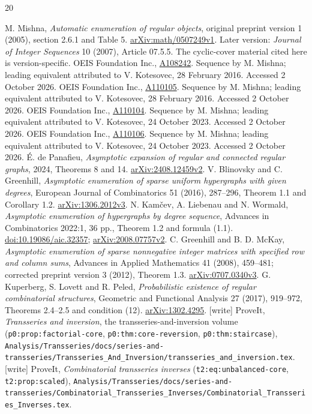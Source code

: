 \documentclass[11pt]{article}
\theoremstyle{definition}\newtheorem{definition}[theorem]{Definition}
\theoremstyle{remark}\newtheorem{remark}[theorem]{Remark}
\numberwithin{equation}{section}
\begin{document}
\begin{thebibliography}{20}
\small\raggedright
\setlength{\itemsep}{3pt}
 M. Mishna, \emph{Automatic enumeration of regular objects}, original preprint version 1 (2005), section 2.6.1 and Table 5. \href{https://arxiv.org/abs/math/0507249v1}{arXiv:math/0507249v1}. Later version: \emph{Journal of Integer Sequences} 10 (2007), Article 07.5.5. The cyclic-cover material cited here is version-specific.
 OEIS Foundation Inc., \href{https://oeis.org/A108242}{A108242}. Sequence by M. Mishna; leading equivalent attributed to V. Kotesovec, 28 February 2016. Accessed 2 October 2026.
 OEIS Foundation Inc., \href{https://oeis.org/A110105}{A110105}. Sequence by M. Mishna; leading equivalent attributed to V. Kotesovec, 28 February 2016. Accessed 2 October 2026.
 OEIS Foundation Inc., \href{https://oeis.org/A110104}{A110104}. Sequence by M. Mishna; leading equivalent attributed to V. Kotesovec, 24 October 2023. Accessed 2 October 2026.
 OEIS Foundation Inc., \href{https://oeis.org/A110106}{A110106}. Sequence by M. Mishna; leading equivalent attributed to V. Kotesovec, 24 October 2023. Accessed 2 October 2026.
 \'E. de Panafieu, \emph{Asymptotic expansion of regular and connected regular graphs}, 2024, Theorems 8 and 14. \href{https://arxiv.org/abs/2408.12459v2}{arXiv:2408.12459v2}.
 V. Blinovsky and C. Greenhill, \emph{Asymptotic enumeration of sparse uniform hypergraphs with given degrees}, European Journal of Combinatorics 51 (2016), 287--296, Theorem 1.1 and Corollary 1.2. \href{https://arxiv.org/abs/1306.2012v3}{arXiv:1306.2012v3}.
 N. Kam\v{c}ev, A. Liebenau and N. Wormald, \emph{Asymptotic enumeration of hypergraphs by degree sequence}, Advances in Combinatorics 2022:1, 36 pp., Theorem 1.2 and formula (1.1). \href{https://doi.org/10.19086/aic.32357}{doi:10.19086/aic.32357}; \href{https://arxiv.org/abs/2008.07757v2}{arXiv:2008.07757v2}.
 C. Greenhill and B. D. McKay, \emph{Asymptotic enumeration of sparse nonnegative integer matrices with specified row and column sums}, Advances in Applied Mathematics 41 (2008), 459--481; corrected preprint version 3 (2012), Theorem 1.3. \href{https://arxiv.org/abs/0707.0340v3}{arXiv:0707.0340v3}.
 G. Kuperberg, S. Lovett and R. Peled, \emph{Probabilistic existence of regular combinatorial structures}, Geometric and Functional Analysis 27 (2017), 919--972, Theorems 2.4--2.5 and condition (12). \href{https://arxiv.org/abs/1302.4295}{arXiv:1302.4295}.
 [write] ProveIt, \emph{Transseries and inversion}, the
transseries-and-inversion volume (\texttt{p0:prop:factorial-core},
\texttt{p0:thm:core-reversion}, \texttt{p0:thm:staircase}),
\nolinkurl{Analysis/Transseries/docs/series-and-transseries/Transseries_And_Inversion/transseries_and_inversion.tex}.
 [write] ProveIt, \emph{Combinatorial transseries
inverses} (\texttt{t2:eq:unbalanced-core}, \texttt{t2:prop:scaled}),
\nolinkurl{Analysis/Transseries/docs/series-and-transseries/Combinatorial_Transseries_Inverses/Combinatorial_Transseries_Inverses.tex}.
\end{thebibliography}
\end{document}
